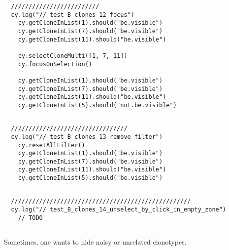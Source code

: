 \begin{verbatim}
  /////////////////////////
  cy.log("// test_B_clones_12_focus")
    cy.getCloneInList(1).should("be.visible")
    cy.getCloneInList(7).should("be.visible")
    cy.getCloneInList(11).should("be.visible")

    cy.selectCloneMulti([1, 7, 11])
    cy.focusOnSelection()

    cy.getCloneInList(1).should("be.visible")
    cy.getCloneInList(7).should("be.visible")
    cy.getCloneInList(11).should("be.visible")
    cy.getCloneInList(5).should("not.be.visible")


\end{verbatim}

\begin{verbatim}
  /////////////////////////////////
  cy.log("// test_B_clones_13_remove_filter")
    cy.resetAllFilter()
    cy.getCloneInList(1).should("be.visible")
    cy.getCloneInList(7).should("be.visible")
    cy.getCloneInList(11).should("be.visible")
    cy.getCloneInList(5).should("be.visible")


\end{verbatim}

\begin{verbatim}
  ///////////////////////////////////////////////////
  cy.log("// test_B_clones_14_unselect_by_click_in_empty_zone")
    // TODO


\end{verbatim}

Sometimes, one wants to hide noisy or unrelated clonotypes.

